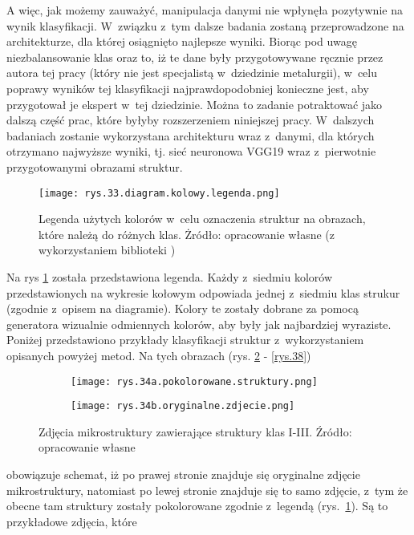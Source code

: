 A więc, jak możemy zauważyć, manipulacja danymi nie wpłynęła pozytywnie na wynik klasyfikacji. W~związku z~tym dalsze badania zostaną przeprowadzone na architekturze, dla której osiągnięto najlepsze wyniki. Biorąc pod uwagę niezbalansowanie klas oraz to, iż te dane były przygotowywane ręcznie przez autora tej pracy (który nie jest specjalistą w~dziedzinie metalurgii), w~celu poprawy wyników tej klasyfikacji najprawdopodobniej konieczne jest, aby przygotował je ekspert w~tej dziedzinie. Można to zadanie potraktować jako dalszą część prac, które byłyby rozszerzeniem niniejszej pracy. W~dalszych badaniach zostanie wykorzystana architekturu wraz z~danymi, dla których otrzymano najwyższe wyniki, tj. sieć neuronowa VGG19 wraz z~pierwotnie przygotowanymi obrazami struktur.
\begin{figure}[h]
    \centering
    \texttt{[image: rys.33.diagram.kolowy.legenda.png]} %
    \caption{Legenda użytych kolorów w~celu oznaczenia struktur na obrazach, które należą do różnych klas. Żródło: opracowanie własne (z wykorzystaniem biblioteki )}
    \label{rys.33.diagram.kolowy.legenda.png}
\end{figure}
Na rys \ref{rys.33.diagram.kolowy.legenda.png} została przedstawiona legenda. Każdy z~siedmiu kolorów przedstawionych na wykresie kołowym odpowiada jednej z~siedmiu klas strukur (zgodnie z~opisem na diagramie). Kolory te zostały dobrane za pomocą generatora wizualnie odmiennych kolorów, aby były jak najbardziej wyraziste. Poniżej przedstawiono przykłady klasyfikacji struktur z~wykorzystaniem opisanych powyżej metod. Na tych obrazach (rys. \ref{rys.34} - \ref{rys.38}) 
\begin{figure}[h]
	\centering
	\begin{subfigure}{0.42\textwidth}
	    \centering
	    \texttt{[image: rys.34a.pokolorowane.struktury.png]}
	\end{subfigure}
	\begin{subfigure}{0.42\textwidth}
	    \centering
	    \texttt{[image: rys.34b.oryginalne.zdjecie.png]}
	\end{subfigure}
	\caption{\label{rys.34}Zdjęcia mikrostruktury zawierające struktury klas I-III. Źródło: opracowanie własne}
\end{figure}
obowiązuje schemat, iż po prawej stronie znajduje się oryginalne zdjęcie mikrostruktury, natomiast po lewej stronie znajduje się to samo zdjęcie, z~tym że obecne tam struktury zostały pokolorowane zgodnie z~legendą (rys.~\ref{rys.33.diagram.kolowy.legenda.png}). Są to przykładowe zdjęcia, które 
